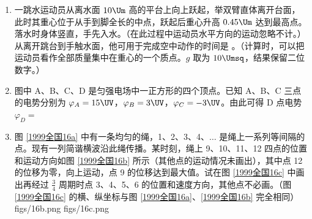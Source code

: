 \documentclass[\gkver]{gaokaozhenti}
\begin{document}
\begin{enumerate}
\item
一跳水运动员从离水面 $10\Um$ 高的平台上向上跃起，举双臂直体离开台面，此时其重心位于从手到脚全长的中点，跃起后重心升高 $0.45\Um$ 达到最高点。落水时身体竖直，手先入水。（在此过程中运动员水平方向的运动忽略不计。）从离开跳台到手触水面，他可用于完成空中动作的时间是 \tkanswer[1.5cm]{$1.7\Us$}。（计算时，可以把运动员看作全部质量集中在重心的一个质点。$g$ 取为 $10\Umsq$，结果保留二位数字。）

\item
图中 A、B、C、D 是匀强电场中一正方形的四个顶点。已知 A、B、C 三点的电势分别为 $\varphi_{A} = 15\UV$，$\varphi_{B} = 3\UV$，$\varphi_{C} = -3\UV$。由此可得 D 点电势 $\varphi_{D} =$ \tkanswer[1.2cm]{$9\UV$}
\onepicture[align=right, w=3.12cm]{}
\jdanswer{
$9\UV$
}

\item
图 \ref{1999全国16a} 中有一条均匀的绳，1、2、3、4、$\ldots$ 是绳上一系列等间隔的点。现有一列简谐横波沿此绳传播。某时刻，绳上 9、10、11、12 四点的位置和运动方向如图 \ref{1999全国16b} 所示（其他点的运动情况未画出），其中点 12 的位移为零，向上运动，点 9 的位移达到最大值。试在图 \ref{1999全国16c} 中画出再经过 $\frac{3}{4}$ 周期时点 3、4、5、6 的位置和速度方向，其他点不必画。（图 \ref{1999全国16c} 的横、纵坐标与图 \ref{1999全国16a}、\ref{1999全国16b} 完全相同）
{figs/16b.png}
{figs/16c.png}
\end{enumerate}
\end{document}
